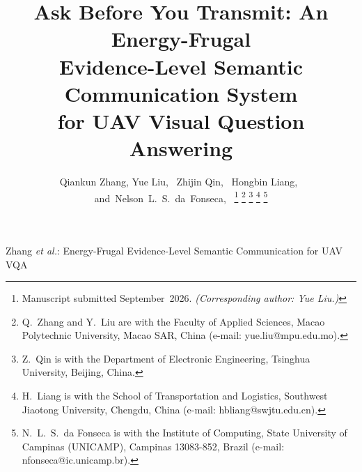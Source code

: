 \documentclass[12pt,lettersize,journal,onecolumn]{IEEEtran}
\begin{document}
\title{Ask Before You Transmit: An Energy-Frugal\\
Evidence-Level Semantic Communication System\\
for UAV Visual Question Answering}

\author{Qiankun Zhang,
        Yue Liu,~
        Zhijin Qin,~
        Hongbin Liang,~
        and~Nelson~L.~S.~da~Fonseca,~
\thanks{Manuscript submitted September~2026. \emph{(Corresponding author: Yue Liu.)}}
\thanks{Q.\ Zhang and Y.\ Liu are with the Faculty of Applied Sciences,
Macao Polytechnic University, Macao SAR, China
(e-mail: yue.liu@mpu.edu.mo).}
\thanks{Z.\ Qin is with the Department of Electronic Engineering, Tsinghua
University, Beijing, China.}
\thanks{H.\ Liang is with the School of Transportation and Logistics,
Southwest Jiaotong University, Chengdu, China
(e-mail: hbliang@swjtu.edu.cn).}
\thanks{N.\ L.\ S.\ da Fonseca is with the Institute of Computing, State
University of Campinas (UNICAMP), Campinas 13083-852, Brazil
(e-mail: nfonseca@ic.unicamp.br).}}

%
{Zhang \MakeLowercase{\textit{et al.}}: Energy-Frugal Evidence-Level Semantic Communication for UAV VQA}

\maketitle
\end{document}
